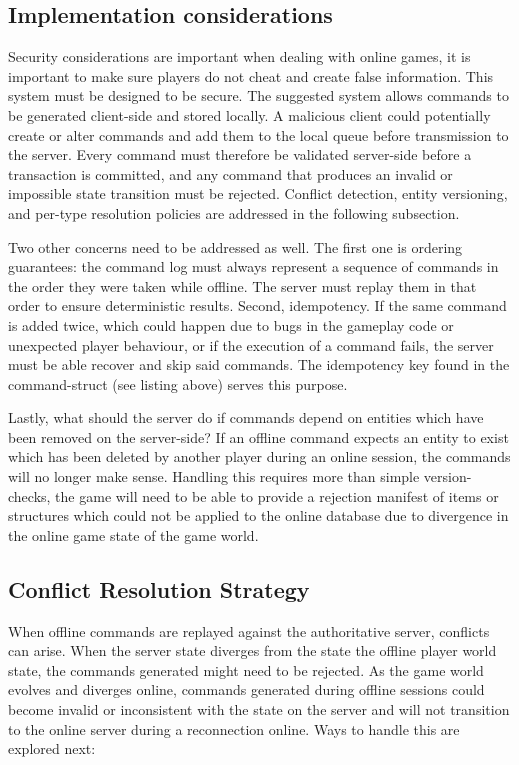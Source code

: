 \documentclass{article}
\begin{document}
\subsection{Implementation considerations}

Security considerations are important when dealing with online games, it is important to make sure players do not cheat and create false information. This system must be designed to be secure. The suggested system allows commands to be generated client-side and stored locally. A malicious client could potentially create or alter commands and add them to the local queue before transmission to the server. Every command must therefore be validated server-side before a transaction is committed, and any command that produces an invalid or impossible state transition must be rejected. Conflict detection, entity versioning, and per-type resolution policies are addressed in the following subsection.

Two other concerns need to be addressed as well. The first one is ordering guarantees: the command log must always represent a sequence of commands in the order they were taken while offline. The server must replay them in that order to ensure deterministic results. Second, idempotency. If the same command is added twice, which could happen due to bugs in the gameplay code or unexpected player behaviour, or if the execution of a command fails, the server must be able recover and skip said commands. The idempotency key found in the command-struct (see listing above) serves this purpose.

Lastly, what should the server do if commands depend on entities which have been removed on the server-side? If an offline command expects an entity to exist which has been deleted by another player during an online session, the commands will no longer make sense. Handling this requires more than simple version-checks, the game will need to be able to provide a rejection manifest of items or structures which could not be applied to the online database due to divergence in the online game state of the game world.

\subsection{Conflict Resolution Strategy}
\label{sec:conflictresolution}

When offline commands are replayed against the authoritative server, conflicts can arise. When the server state diverges from the state the offline player world state, the commands generated might need to be rejected. As the game world evolves and diverges online, commands generated during offline sessions could become invalid or inconsistent with the state on the server and will not transition to the online server during a reconnection online. Ways to handle this are explored next:
\end{document}
